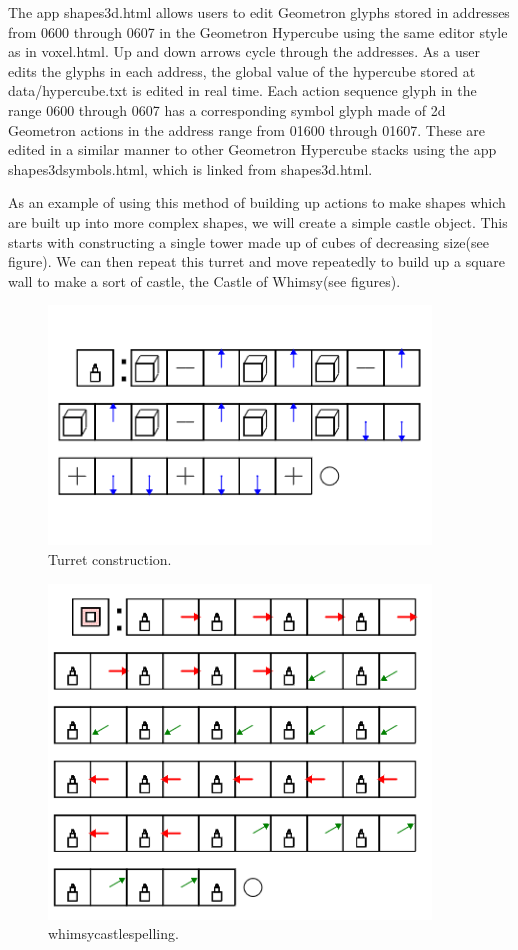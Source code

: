 The app shapes3d.html allows users to edit Geometron glyphs stored in addresses from 0600 through 0607 in the Geometron Hypercube using the same editor style as in voxel.html.  Up and down arrows cycle through the addresses.  As a user edits the glyphs in each address, the global value of the hypercube stored at data/hypercube.txt is edited in real time.  Each action sequence glyph in the range 0600 through 0607 has a corresponding symbol glyph made of 2d Geometron actions in the address range from 01600 through 01607.  These are edited in a similar manner to other Geometron Hypercube stacks using the app shapes3dsymbols.html, which is linked from shapes3d.html.  

As an example of using this method of building up actions to make shapes which are built up into more complex shapes, we will create a simple castle object.  This starts with constructing a single tower made up of cubes of decreasing size(see figure).  We can then repeat this turret and move repeatedly to build up a square wall to make a sort of castle, the Castle of Whimsy(see figures).  

\begin{figure}
	\centering
	\includegraphics[width=4in]{figures/geometron3d/whimsycastleturret.png}
	\caption[whimsycastleturret]
	{Turret construction.}
\end{figure}

\begin{figure}
	\centering
	\includegraphics[width=4in]{figures/geometron3d/whimsycastlespelling.png}
	\caption[whimsycastlespelling]
	{whimsycastlespelling.}
\end{figure}


